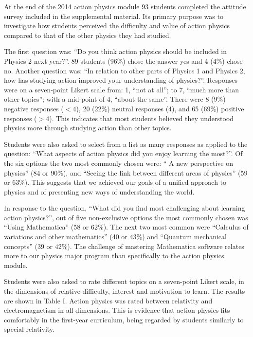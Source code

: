 \documentclass[prb,oncolumn]{revtex4-2}
\begin{document}
At the end of the 2014 action physics module 93 students completed the attitude survey included in the supplemental material. \cite{supplement} Its primary purpose was to investigate how students perceived the difficulty and value of action physics compared to that of the other physics they had studied. 

The first question was: ``Do you think action physics should be included in Physics 2 next year?''. 89 students (96\%) chose the answer yes and 4 (4\%) chose no. Another question was: ``In relation to other parts of Physics 1 and Physics 2, how has studying action improved your understanding of physics?''. Responses were on a seven-point Likert scale from: 1, ``not at all''; to 7, ``much more than other topics''; with a mid-point of 4, ``about the same''. There were 8 (9\%) negative responses ($<4$), 20 (22\%) neutral responses (4), and 65 (69\%) positive responses ($>4$). This indicates that most students believed they understood physics more through studying action than other topics.

Students were also asked to select from a list as many responses as applied to the question: ``What aspects of action physics did you enjoy learning the most?''. Of the six options the two most commonly chosen were: `` A new perspective on physics'' (84 or 90\%), and ``Seeing the link between different areas of physics'' (59 or 63\%). This suggests that we achieved our goals of a unified approach to physics and of presenting new ways of understanding the world. 

In response to the question, ``What did you find most challenging about learning action physics?'', out of five non-exclusive options the most commonly chosen was ``Using Mathematica'' (58 or 62\%). The next two most common were ``Calculus of variations and other mathematics'' (40 or 43\%) and ``Quantum mechanical concepts'' (39 or 42\%). The challenge of mastering Mathematica software relates more to our physics major program than specifically to the action physics module. \cite{Mathematica}

Students were also asked to rate different topics on a seven-point Likert scale, in the dimensions of relative difficulty, interest and motivation to learn. The results are shown in Table I. Action physics was rated between relativity and electromagnetism in all dimensions. This is evidence that action physics fits comfortably in the first-year curriculum, being regarded by students similarly to special relativity.
\end{document}
